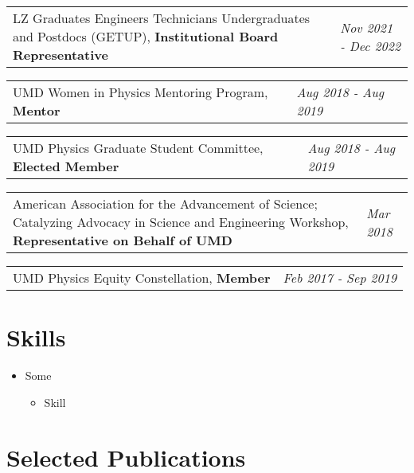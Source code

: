 \documentclass[
  10pt,
  letterpaper,
  DIV=11,
  numbers=noendperiod]{scrartcl}
\providecommand{\tightlist}{%
  \setlength{\itemsep}{0pt}\setlength{\parskip}{0pt}}\usepackage{longtable,booktabs,array}
\begin{document}
\begin{tabularx}{\textwidth}{>{\RaggedRight}p{}  >{\RaggedLeft}X} LZ Graduates Engineers Technicians Undergraduates and Postdocs (GETUP), \textbf{Institutional Board Representative} & \textcolor{mygray}{\textit{Nov 2021 - Dec 2022}}  \end{tabularx}

\begin{tabularx}{\textwidth}{>{\RaggedRight}p{}  >{\RaggedLeft}X} UMD Women in Physics Mentoring Program, \textbf{Mentor} & \textcolor{mygray}{\textit{Aug 2018 - Aug 2019}}  \end{tabularx}

\begin{tabularx}{\textwidth}{>{\RaggedRight}p{}  >{\RaggedLeft}X} UMD Physics Graduate Student Committee, \textbf{Elected Member} & \textcolor{mygray}{\textit{Aug 2018 - Aug 2019}}  \end{tabularx}

\begin{tabularx}{\textwidth}{>{\RaggedRight}p{}  >{\RaggedLeft}X} American Association for the Advancement of Science; Catalyzing Advocacy in Science and Engineering Workshop, \textbf{Representative on Behalf of UMD} & \textcolor{mygray}{\textit{Mar 2018}}  \end{tabularx}

\begin{tabularx}{\textwidth}{>{\RaggedRight}p{}  >{\RaggedLeft}X} UMD Physics Equity Constellation, \textbf{Member} & \textcolor{mygray}{\textit{Feb 2017 - Sep 2019}}  \end{tabularx}

\hypertarget{fa-tools-skills}{%
\section{\texorpdfstring{
Skills}{ Skills}}\label{fa-tools-skills}}

\begin{itemize}
\tightlist
\item
  Some

  \begin{itemize}
  \tightlist
  \item
    Skill
  \end{itemize}
\end{itemize}

\hypertarget{fa-pen-nib-selected-publications}{%
\section{\texorpdfstring{ Selected
Publications}{ Selected Publications}}\label{fa-pen-nib-selected-publications}}
\end{document}
